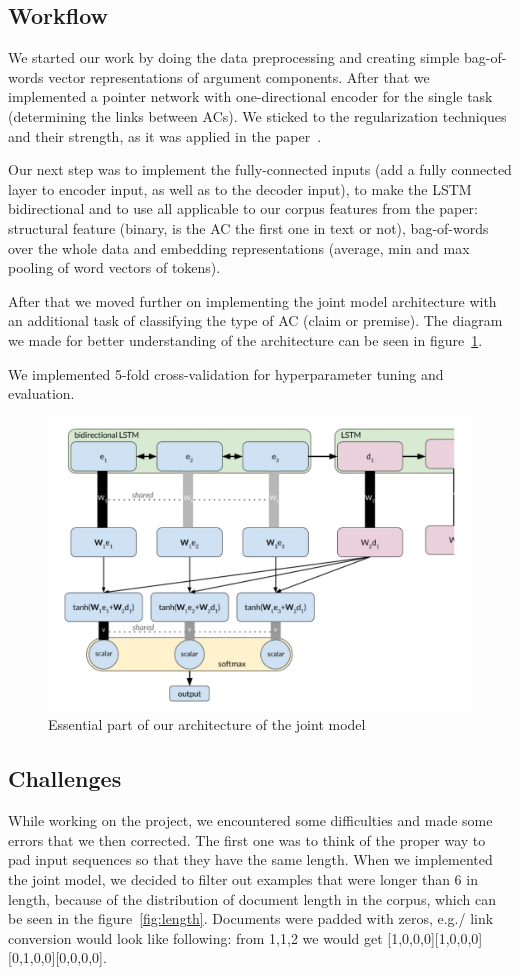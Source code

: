 \documentclass[onecolumn]{article}
\begin{document}
\subsection{Workflow}
We started our work by doing the data preprocessing and creating simple bag-of-words vector representations of argument components.
After that we implemented a pointer network with one-directional encoder for the single task (determining the links between ACs).
We sticked to the regularization techniques and their strength, as it was applied in the paper~\cite{potash2017here}.

Our next step was to implement the fully-connected inputs (add a fully connected layer to encoder input,
as well as to the decoder input), to make the LSTM bidirectional and to use all applicable to our corpus features from the paper: structural feature
(binary, is the AC the first one in text or not), bag-of-words over the whole data and embedding representations (average, min and max pooling
of word vectors of tokens).

After that we moved further on implementing the joint model architecture with an additional task of classifying the type of AC (claim or premise).
The diagram we made for better understanding of the architecture can be seen in figure~\ref{fig:our-model}.

We implemented 5-fold cross-validation for hyperparameter tuning and evaluation.
\begin{figure}[h]
    \centering
    \includegraphics[width=0.8\linewidth]{fig/architecture.png}
    \caption{Essential part of our architecture of the joint model}\label{fig:our-model}
\end{figure}

\subsection{Challenges}
While working on the project, we encountered some difficulties and made some errors that we then corrected. The first one
was to think of the proper way to pad input sequences so that they have the same length. When we implemented the joint model,
we decided to filter out examples that were longer than 6 in length, because of the distribution of document length in the corpus, which
can be seen in the figure~\ref{fig:length}. Documents were padded with zeros, e.g./ link conversion would look like following:
from 1,1,2 we would get [1,0,0,0][1,0,0,0][0,1,0,0][0,0,0,0].
\end{document}
